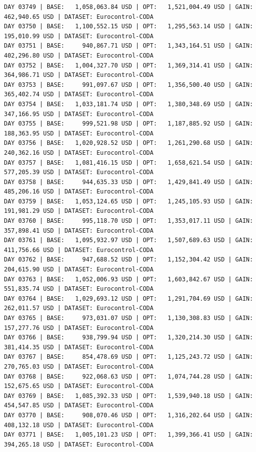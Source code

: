 \documentclass[11pt,a4paper]{article}
\begin{document}
\begin{verbatim}
DAY 03749 | BASE:   1,058,063.84 USD | OPT:   1,521,004.49 USD | GAIN: 462,940.65 USD | DATASET: Eurocontrol-CODA
DAY 03750 | BASE:   1,100,552.15 USD | OPT:   1,295,563.14 USD | GAIN: 195,010.99 USD | DATASET: Eurocontrol-CODA
DAY 03751 | BASE:     940,867.71 USD | OPT:   1,343,164.51 USD | GAIN: 402,296.80 USD | DATASET: Eurocontrol-CODA
DAY 03752 | BASE:   1,004,327.70 USD | OPT:   1,369,314.41 USD | GAIN: 364,986.71 USD | DATASET: Eurocontrol-CODA
DAY 03753 | BASE:     991,097.67 USD | OPT:   1,356,500.40 USD | GAIN: 365,402.74 USD | DATASET: Eurocontrol-CODA
DAY 03754 | BASE:   1,033,181.74 USD | OPT:   1,380,348.69 USD | GAIN: 347,166.95 USD | DATASET: Eurocontrol-CODA
DAY 03755 | BASE:     999,521.98 USD | OPT:   1,187,885.92 USD | GAIN: 188,363.95 USD | DATASET: Eurocontrol-CODA
DAY 03756 | BASE:   1,020,928.52 USD | OPT:   1,261,290.68 USD | GAIN: 240,362.16 USD | DATASET: Eurocontrol-CODA
DAY 03757 | BASE:   1,081,416.15 USD | OPT:   1,658,621.54 USD | GAIN: 577,205.39 USD | DATASET: Eurocontrol-CODA
DAY 03758 | BASE:     944,635.33 USD | OPT:   1,429,841.49 USD | GAIN: 485,206.16 USD | DATASET: Eurocontrol-CODA
DAY 03759 | BASE:   1,053,124.65 USD | OPT:   1,245,105.93 USD | GAIN: 191,981.29 USD | DATASET: Eurocontrol-CODA
DAY 03760 | BASE:     995,118.70 USD | OPT:   1,353,017.11 USD | GAIN: 357,898.41 USD | DATASET: Eurocontrol-CODA
DAY 03761 | BASE:   1,095,932.97 USD | OPT:   1,507,689.63 USD | GAIN: 411,756.66 USD | DATASET: Eurocontrol-CODA
DAY 03762 | BASE:     947,688.52 USD | OPT:   1,152,304.42 USD | GAIN: 204,615.90 USD | DATASET: Eurocontrol-CODA
DAY 03763 | BASE:   1,052,006.93 USD | OPT:   1,603,842.67 USD | GAIN: 551,835.74 USD | DATASET: Eurocontrol-CODA
DAY 03764 | BASE:   1,029,693.12 USD | OPT:   1,291,704.69 USD | GAIN: 262,011.57 USD | DATASET: Eurocontrol-CODA
DAY 03765 | BASE:     973,031.07 USD | OPT:   1,130,308.83 USD | GAIN: 157,277.76 USD | DATASET: Eurocontrol-CODA
DAY 03766 | BASE:     938,799.94 USD | OPT:   1,320,214.30 USD | GAIN: 381,414.35 USD | DATASET: Eurocontrol-CODA
DAY 03767 | BASE:     854,478.69 USD | OPT:   1,125,243.72 USD | GAIN: 270,765.03 USD | DATASET: Eurocontrol-CODA
DAY 03768 | BASE:     922,068.63 USD | OPT:   1,074,744.28 USD | GAIN: 152,675.65 USD | DATASET: Eurocontrol-CODA
DAY 03769 | BASE:   1,085,392.33 USD | OPT:   1,539,940.18 USD | GAIN: 454,547.85 USD | DATASET: Eurocontrol-CODA
DAY 03770 | BASE:     908,070.46 USD | OPT:   1,316,202.64 USD | GAIN: 408,132.18 USD | DATASET: Eurocontrol-CODA
DAY 03771 | BASE:   1,005,101.23 USD | OPT:   1,399,366.41 USD | GAIN: 394,265.18 USD | DATASET: Eurocontrol-CODA

\end{verbatim}
\end{document}
